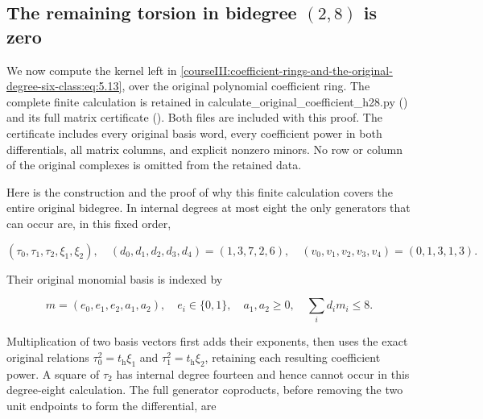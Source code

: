\label{courseIII:coefficient-rings-and-the-original-degree-six-class:coefficient-original-h28}

\subsection{The remaining torsion in bidegree \((2,8)\) is zero}
\label{courseIII:coefficient-rings-and-the-original-degree-six-class:section-6}

\label{courseIII:coefficient-rings:6}

We now compute the kernel left in \eqref{courseIII:coefficient-rings-and-the-original-degree-six-class:eq:5.13}, over the original polynomial coefficient ring. The complete finite calculation is retained in calculate\_original\_coefficient\_h28.py () and its full matrix certificate (). Both files are included with this proof. The certificate includes every original basis word, every coefficient power in both differentials, all matrix columns, and explicit nonzero minors. No row or column of the original complexes is omitted from the retained data.

Here is the construction and the proof of why this finite calculation covers the entire original bidegree. In internal degrees at most eight the only generators that can occur are, in this fixed order,

\begin{equation}
(\tau_0,\tau_1,\tau_2,\xi_1,\xi_2),
 \quad
 (d_0,d_1,d_2,d_3,d_4)=(1,3,7,2,6),
 \quad
 (v_0,v_1,v_2,v_3,v_4)=(0,1,3,1,3).
 \label{courseIII:coefficient-rings-and-the-original-degree-six-class:eq:6.1}
\end{equation}

Their original monomial basis is indexed by

\begin{equation}
m=(e_0,e_1,e_2,a_1,a_2),\quad
 e_i\in\{0,1\},\quad a_1,a_2\geq0,\quad
 \sum_i d_i m_i\leq8.
 \label{courseIII:coefficient-rings-and-the-original-degree-six-class:eq:6.2}
\end{equation}

Multiplication of two basis vectors first adds their exponents, then uses the exact original relations \(\tau_0^2=t_{\mathrm h}\xi_1\) and \(\tau_1^2=t_{\mathrm h}\xi_2\), retaining each resulting coefficient power. A square of \(\tau_2\) has internal degree fourteen and hence cannot occur in this degree-eight calculation. The full generator coproducts, before removing the two unit endpoints to form the differential, are

